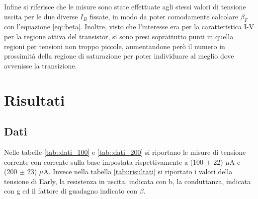 \documentclass[a4paper,11pt]{article}
\begin{document}
Infine si riferisce che le misure sono state effettuate agli stessi valori di tensione uscita per le due diverse $I_B$ fissate, in modo da poter comodamente calcolare $\beta_F$ con l'equazione \ref{eq::beta}. Inoltre, visto che l'interesse era per la caratteristica I-V per la regione attiva del transistor, si sono presi soprattutto punti in quella regioni per tensioni non troppo piccole, aumentandone però il numero in prossimità della regione di saturazione per poter individuare al meglio dove avvenisse la transizione. 

\section{Risultati}

\subsection{Dati}
Nelle tabelle \ref{tab::dati_100} e \ref{tab::dati_200} si riportano le misure di tensione corrente con corrente sulla base impostata rispettivamente a (100 $\pm$ 22) $\mu \mathrm{A}$ e (200 $\pm$ 23) $\mu \mathrm{A}$. Invece nella tabella \ref{tab::risultati} si riportato i valori della tensione di Early, la resistenza in uscita, indicata con b, la conduttanza, indicata con g ed il fattore di guadagno indicato con $\beta$.
\end{document}
